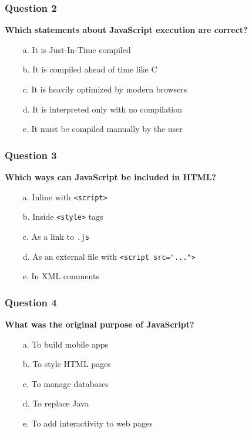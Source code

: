 \documentclass{article}
\newcommand{\cmark}{\textcolor{green}{\ding{51}}} %
\newcommand{\xmark}{\textcolor{red}{\ding{55}}}   %
\begin{document}
\subsubsection*{Question 2}
\textbf{Which statements about JavaScript execution are correct?}
\begin{itemize}
  \item[\cmark\ a.] It is Just-In-Time compiled
  \item[\xmark\ b.] It is compiled ahead of time like C
  \item[\cmark\ c.] It is heavily optimized by modern browsers
  \item[\xmark\ d.] It is interpreted only with no compilation
  \item[\xmark\ e.] It must be compiled manually by the user
\end{itemize}

\subsubsection*{Question 3}
\textbf{Which ways can JavaScript be included in HTML?}

\begin{itemize}
  \item[\cmark\ a.] Inline with \texttt{<script>}
  \item[\xmark\ b.] Inside \texttt{<style>} tags
  \item[\xmark\ c.] As a link to \texttt{.js}
  \item[\cmark\ d.] As an external file with \texttt{<script src="...">}
  \item[\xmark\ e.] In XML comments
\end{itemize}

\subsubsection*{Question 4}
\textbf{What was the original purpose of JavaScript?}

\begin{itemize}
  \item[\xmark\ a.] To build mobile apps
  \item[\xmark\ b.] To style HTML pages
  \item[\xmark\ c.] To manage databases
  \item[\xmark\ d.] To replace Java
  \item[\cmark\ e.] To add interactivity to web pages
\end{itemize}
\end{document}
